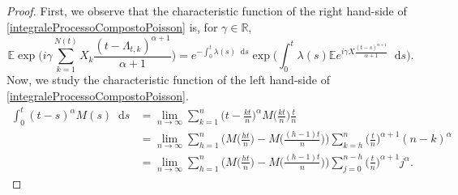 \documentclass[10pt,a4paper]{amsart}
\newcommand*\dif{\mathop{}\!\mathrm{d}}  %
\begin{document}
\begin{proof}
	First, we observe that the characteristic function of the right hand-side of \eqref{integraleProcessoCompostoPoisson} is, for $\gamma \in\mathbb{R}$,
	\begin{equation}
		\mathbb{E}\exp\Bigg( i\gamma \sum_{k=1}^{N(t)} X_k\frac{(t-\Lambda_{t,k})^{\alpha+1}}{\alpha+1} \Bigg)= e^{-\int_0^t \lambda(s)\dif s} \exp\Bigg( \int_0^t \lambda(s) \mathbb{E} e^{i\gamma X \frac{(t-s)^{\alpha+1}}{ \alpha+1} }\dif s \Bigg).
	\end{equation}
	Now, we study the characteristic function of the left hand-side of \eqref{integraleProcessoCompostoPoisson}.
\begin{align}
\int_0^t (t-s)^\alpha M(s)\dif s & = 	\lim_{n\rightarrow \infty} \sum_{k=1}^n \bigg(t-\frac{kt}{n}\bigg)^\alpha M\bigg(\frac{kt}{n}\bigg)\frac{t}{n}\nonumber \\
& =  \lim_{n\rightarrow \infty} \sum_{h=1}^n \Bigg(M\bigg(\frac{ht}{n}\bigg) - M\bigg(\frac{(h-1)t}{n}\bigg) \Bigg) \sum_{k = h}^n \bigg(\frac{t}{n}\bigg)^{\alpha+1}(n-k)^\alpha \nonumber \\
&= \lim_{n\rightarrow \infty} \sum_{h=1}^n \Bigg(M\bigg(\frac{ht}{n}\bigg) - M\bigg(\frac{(h-1)t}{n}\bigg) \Bigg) \sum_{j = 0}^{n-h} \bigg(\frac{t}{n}\bigg)^{\alpha+1} j^\alpha .\label{primaRappresentazioneIntegraleFrazinarioCompound}
\end{align}


\end{proof}
\end{document}
